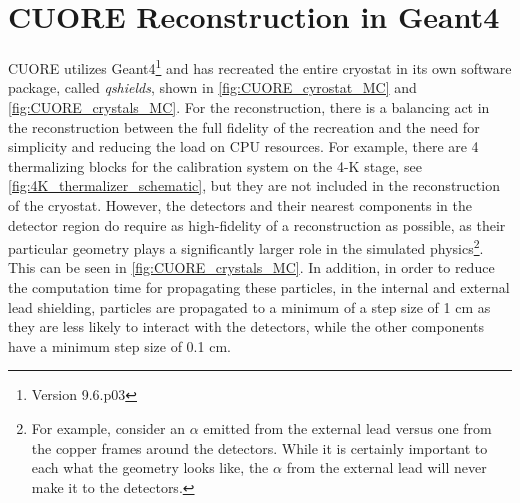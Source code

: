 \section{CUORE Reconstruction in Geant4}
CUORE utilizes Geant4\footnote{Version 9.6.p03} and has recreated the entire cryostat in its own software package, called \textit{qshields}, shown in \autoref{fig:CUORE_cyrostat_MC} and \autoref{fig:CUORE_crystals_MC}.
For the reconstruction, there is a balancing act in the reconstruction between the full fidelity of the recreation and the need for simplicity and reducing the load on CPU resources.
For example, there are 4 thermalizing blocks for the calibration system on the 4-K stage, see \autoref{fig:4K_thermalizer_schematic}, but they are not included in the reconstruction of the cryostat.
However, the detectors and their nearest components in the detector region do require as high-fidelity of a reconstruction as possible, as their particular geometry plays a significantly larger role in the simulated physics\footnote{For example, consider an $\alpha$ emitted from the external lead versus one from the copper frames around the detectors.
While it is certainly important to each what the geometry looks like, the $\alpha$ from the external lead will never make it to the detectors.}.
This can be seen in \autoref{fig:CUORE_crystals_MC}.
In addition, in order to reduce the computation time for propagating these particles, in the internal and external lead shielding, particles are propagated to a minimum of a step size of 1 cm as they are less likely to interact with the detectors, while the other components have a minimum step size of 0.1 cm.

